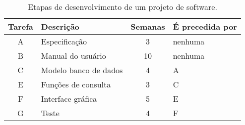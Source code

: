 \begin{table}[ht]
\begin{center}
\bigskip\begingroup\small
\begin{tabular}{c|l|c|l}\hline
\bf Tarefa & \bf\hfil Descrição & \bf Semanas & \bf É precedida por \\\hline\hline
  A & Especificação         & 3  & nenhuma\\
  B & Manual do usuário     & 10 & nenhuma \\
  C & Modelo banco de dados & 4  & A \\
  E & Funções de consulta   & 3  & C  \\
  F & Interface gráfica     & 5  & E  \\
  G & Teste                 & 4  & F  \\\hline
\end{tabular}
\caption{Etapas de desenvolvimento de um projeto de software.}
\label{tab:tasks}
\endgroup
\end{center}
\end{table}

